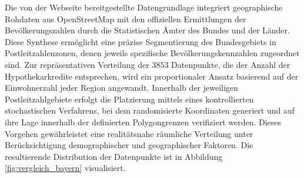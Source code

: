 Die von der Webseite \parencite{suche_postleitzahl} bereitgestellte Datengrundlage integriert geographische Rohdaten aus OpenStreetMap mit den offiziellen Ermittlungen der Bevölkerungszahlen durch die Statistischen Ämter des Bundes und der Länder. Diese Synthese ermöglicht eine präzise Segmentierung des Bundesgebiets in Postleitzahlenzonen, denen jeweils spezifische Bevölkerungskennzahlen zugeordnet sind.
Zur repräsentativen Verteilung der 3853 Datenpunkte, die der Anzahl der Hypothekarkredite entsprechen, wird ein proportionaler Ansatz basierend auf der Einwohnerzahl jeder Region angewandt. Innerhalb der jeweiligen Postleitzahlgebiete erfolgt die Platzierung mittels eines kontrollierten stochastischen Verfahrens, bei dem randomisierte Koordinaten generiert und auf ihre Lage innerhalb der definierten Polygongrenzen verifiziert werden. Dieses Vorgehen gewährleistet eine realitätsnahe räumliche Verteilung unter Berücksichtigung demographischer und geographischer Faktoren. Die resultierende Distribution der Datenpunkte ist in Abbildung \ref{fig:vergleich_bayern} visualisiert.
